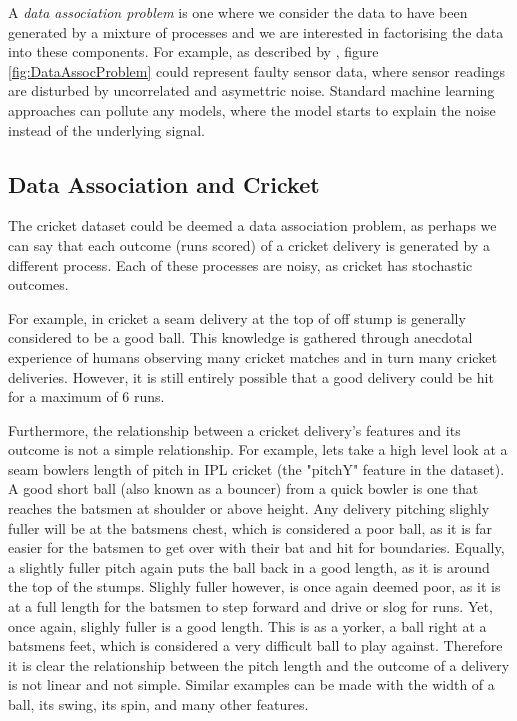 \documentclass[12pt,a4paper]{report}
\theoremstyle{definition}
\begin{document}
A \emph{data association problem} is one where we consider the data to have been generated by a mixture of processes and we are interested in factorising the data into these components. 
For example, as described by \citet{Kaiser2018}, figure \ref{fig:DataAssocProblem} could represent faulty sensor data, where sensor readings are disturbed by uncorrelated and asymettric noise. 
Standard machine learning approaches can pollute any models, where the model starts to explain the noise instead of the underlying signal. 

\subsection{Data Association and Cricket}

The cricket dataset could be deemed a data association problem, as perhaps we can say that each outcome (runs scored) of a cricket delivery is generated by a different process. 
Each of these processes are noisy, as cricket has stochastic outcomes. 

For example, in cricket a seam delivery at the top of off stump is generally considered to be a good ball. 
This knowledge is gathered through anecdotal experience of humans observing many cricket matches and in turn many cricket deliveries.
However, it is still entirely possible that a good delivery could be hit for a maximum of 6 runs. 

Furthermore, the relationship between a cricket delivery's features and its outcome is not a simple relationship. 
For example, lets take a high level look at a seam bowlers length of pitch in IPL cricket (the "pitchY" feature in the dataset).
A good short ball (also known as a bouncer) from a quick bowler is one that reaches the batsmen at shoulder or above height. 
Any delivery pitching slighly fuller will be at the batsmens chest, which is considered a poor ball, as it is far easier for the batsmen to get over with their bat and hit for boundaries.
Equally, a slightly fuller pitch again puts the ball back in a good length, as it is around the top of the stumps. 
Slighly fuller however, is once again deemed poor, as it is at a full length for the batsmen to step forward and drive or slog for runs. 
Yet, once again, slighly fuller is a good length.
This is as a yorker, a ball right at a batsmens feet, which is considered a very difficult ball to play against. 
Therefore it is clear the relationship between the pitch length and the outcome of a delivery is not linear and not simple.
Similar examples can be made with the width of a ball, its swing, its spin, and many other features.
\end{document}
